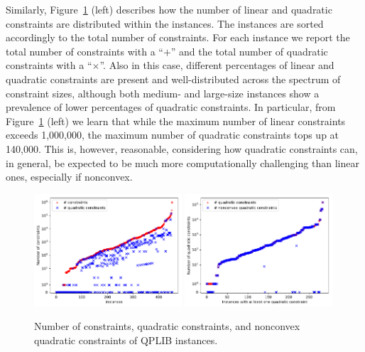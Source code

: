 Similarly, Figure~\ref{fig:pic_constr} (left)
describes how the number of linear and quadratic
constraints are distributed within the instances. The instances are sorted
accordingly to the total number of constraints.
For each instance we report the total number of constraints with a ``$+$''
and the total number of quadratic constraints
with a ``$\times$''. Also in this case, different percentages of linear and
quadratic constraints are present and well-distributed across the spectrum
of constraint sizes, although both medium- and large-size instances show a
prevalence of lower percentages of quadratic constraints. In particular,
from Figure~\ref{fig:pic_constr} (left) we learn that while the maximum number
of linear constraints exceeds 1,000,000, the maximum number of quadratic
constraints tops up at 140,000. This is, however, reasonable, considering
how quadratic constraints can, in general, be expected to be much more
computationally challenging than linear ones, especially if nonconvex.

\begin{figure}\centering
  \includegraphics[width=0.49\textwidth]{pic_constr.pdf}
  \includegraphics[width=0.49\textwidth]{pic_quad_conv_vs_nonconv.pdf}
  \caption{Number of constraints, quadratic constraints, and nonconvex quadratic constraints of QPLIB instances. \label{fig:pic_constr}}
\end{figure}

